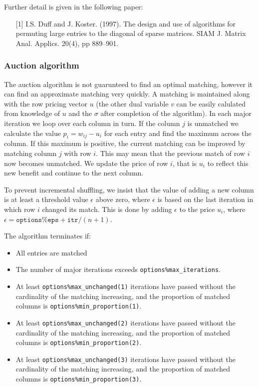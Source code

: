 \noindent
Further detail is given in the following paper:
\begin{itemize}
   \item[{[1]}] I.S. Duff and J. Koster. (1997). The design and use of algorithms for permuting large entries to the diagonal of sparse matrices. SIAM J. Matrix Anal. Applics. 20(4), pp 889--901.
\end{itemize}

\subsubsection{Auction algorithm} \label{method:auction}
The auction algorithm is not guarunteed to find an optimal matching, however it
can find an approximate matching very quickly. A matching is maintained along
with the row pricing vector $u$ (the other dual variable $v$ can be easily
calulated from knowledge of $u$ and the $\sigma$ after completion of the
algorithm). In each major iteration we loop over each column in turn. If the
column $j$ is unmatched we calculate the value $p_i = w_{ij} - u_i$ for each
entry and find the maximum across the column. If this maximum is positive, the
current matching can be improved by matching column $j$ with row $i$. This may
mean that the previous match of row $i$ now becomes unmatched. We update the
price of row $i$, that is $u_i$ to reflect this new benefit and continue to the
next column.

To prevent incremental shuffling, we insist that the value of
adding a new column is at least a threshold value $\epsilon$ above zero, where
$\epsilon$ is based on the last iteration in which row $i$ changed its match.
This is done by adding $\epsilon$ to the price $u_i$, where $\epsilon = \texttt{options\%eps} + \texttt{itr} / (n+1)$.

The algorithm terminates if:
\begin{itemize}
   \item All entries are matched
   \item The number of major iterations exceeds \texttt{options\%max\_iterations}.
   \item At least \texttt{options\%max\_unchanged(1)} iterations have passed without the cardinality of the matching increasing, and the proportion of matched columns is \texttt{options\%min\_proportion(1)}.
   \item At least \texttt{options\%max\_unchanged(2)} iterations have passed without the cardinality of the matching increasing, and the proportion of matched columns is \texttt{options\%min\_proportion(2)}.
   \item At least \texttt{options\%max\_unchanged(3)} iterations have passed without the cardinality of the matching increasing, and the proportion of matched columns is \texttt{options\%min\_proportion(3)}.
\end{itemize}

